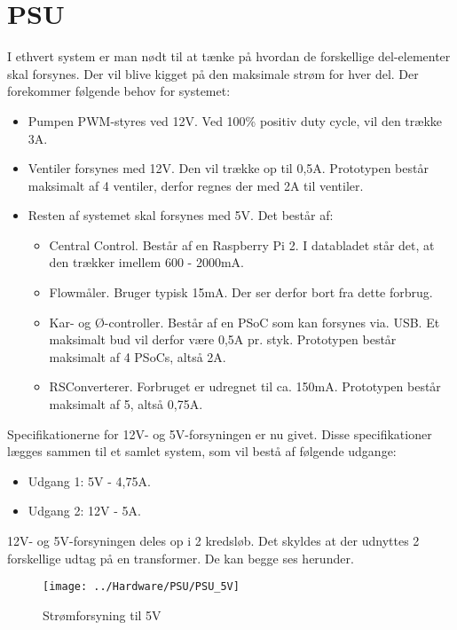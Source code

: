 \section{PSU}
I ethvert system er man nødt til at tænke på hvordan de forskellige del-elementer skal forsynes. Der vil blive kigget på den maksimale strøm for hver del. Der forekommer følgende behov for systemet:

\begin{itemize}
\item Pumpen PWM-styres ved 12V. Ved 100\% positiv duty cycle, vil den trække 3A.
\item Ventiler forsynes med 12V. Den vil trække op til 0,5A. Prototypen består maksimalt af 4 ventiler, derfor regnes der med 2A til ventiler.
\item Resten af systemet skal forsynes med 5V. Det består af:	
		\begin{itemize}
		\item Central Control. Består af en Raspberry Pi 2. I databladet står det, at den trækker imellem 600 - 2000mA. 
		\item Flowmåler. Bruger typisk 15mA. Der ser derfor bort fra dette forbrug.
		\item Kar- og Ø-controller. Består af en PSoC som kan forsynes via. USB. Et maksimalt bud vil derfor være 0,5A pr. styk. Prototypen består maksimalt af  4 PSoCs, altså 2A.
		\item RSConverterer. Forbruget er udregnet til ca. 150mA. Prototypen består maksimalt af 5, altså 0,75A.
		\end{itemize}
\end{itemize}

Specifikationerne for 12V- og 5V-forsyningen er nu givet. Disse specifikationer lægges sammen til et samlet system, som vil bestå af følgende udgange:

\begin{itemize}
\item Udgang 1: 5V - 4,75A.
\item Udgang 2: 12V - 5A. 
\end{itemize}

12V- og 5V-forsyningen deles op i 2 kredsløb. Det skyldes at der udnyttes 2 forskellige udtag på en transformer. De kan begge ses herunder.

\begin{figure}[H]
	\centering
	\texttt{[image: ../Hardware/PSU/PSU\_5V]}
	\caption{Strømforsyning til 5V}
	\label{photo:PSU_5V}
\end{figure}

